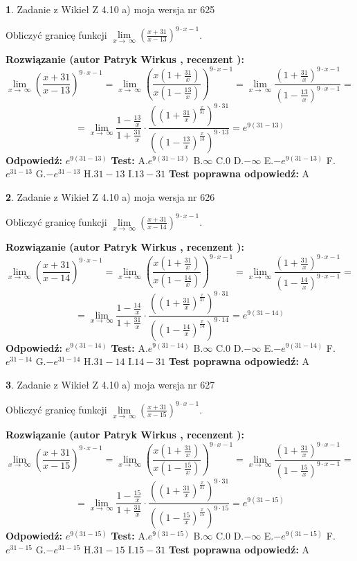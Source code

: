 \documentclass[12pt, a4paper]{article}
\theoremstyle{definition} %
\newtheorem{zad}{}
\newcommand{\zadStart}[1]{\begin{zad}#1\newline}
\newcommand{\zadStop}{\end{zad}}
\newcommand{\rozwStart}[2]{\noindent \textbf{Rozwiązanie (autor #1 , recenzent #2): }\newline}
\newcommand{\rozwStop}{\newline}
\newcommand{\odpStart}{\noindent \textbf{Odpowiedź:}\newline}
\newcommand{\odpStop}{\newline}
\newcommand{\testStart}{\noindent \textbf{Test:}\newline}
\newcommand{\testStop}{\newline}
\newcommand{\kluczStart}{\noindent \textbf{Test poprawna odpowiedź:}\newline}
\newcommand{\kluczStop}{\newline}
\begin{document}
\zadStart{Zadanie z Wikieł Z 4.10 a) moja wersja nr 625}


Obliczyć granicę funkcji  $\lim\limits_{x\to\ \infty}(\frac{x+31}{x-13})^{9\cdot x-1}$.
\zadStop
\rozwStart{Patryk Wirkus}{}
$$\lim\limits_{x\to\ \infty}(\frac{x+31}{x-13})^{9\cdot x-1} = \lim\limits_{x\to\ \infty}(\frac{x(1+\frac{31}{x})}{x(1-\frac{13}{x})})^{9\cdot x-1}=\lim\limits_{x\to\ \infty}\frac{(1+\frac{31}{x})^{9\cdot x-1}}{(1-\frac{13}{x})^{9\cdot x-1}}=$$
$$=\lim\limits_{x\to\ \infty}\frac{1-\frac{13}{x}}{1+\frac{31}{x}}\cdot\frac{((1+\frac{31}{x})^{\frac{x}{31}})^{9\cdot31}}{((1-\frac{13}{x})^{\frac{x}{13}})^{9\cdot13}}=e^{9(31-13)}$$
\rozwStop
\odpStart
$e^{9(31-13)}$
\odpStop
\testStart
A.$e^{9(31-13)}$ B.$\infty$ C.$0$ D.$-\infty$ E.$-e^{9(31-13)}$
F.$e^{31-13}$ G.$-e^{31-13}$
H.$31-13$
I.$13-31$
\testStop
\kluczStart
A
\kluczStop



\zadStart{Zadanie z Wikieł Z 4.10 a) moja wersja nr 626}


Obliczyć granicę funkcji  $\lim\limits_{x\to\ \infty}(\frac{x+31}{x-14})^{9\cdot x-1}$.
\zadStop
\rozwStart{Patryk Wirkus}{}
$$\lim\limits_{x\to\ \infty}(\frac{x+31}{x-14})^{9\cdot x-1} = \lim\limits_{x\to\ \infty}(\frac{x(1+\frac{31}{x})}{x(1-\frac{14}{x})})^{9\cdot x-1}=\lim\limits_{x\to\ \infty}\frac{(1+\frac{31}{x})^{9\cdot x-1}}{(1-\frac{14}{x})^{9\cdot x-1}}=$$
$$=\lim\limits_{x\to\ \infty}\frac{1-\frac{14}{x}}{1+\frac{31}{x}}\cdot\frac{((1+\frac{31}{x})^{\frac{x}{31}})^{9\cdot31}}{((1-\frac{14}{x})^{\frac{x}{14}})^{9\cdot14}}=e^{9(31-14)}$$
\rozwStop
\odpStart
$e^{9(31-14)}$
\odpStop
\testStart
A.$e^{9(31-14)}$ B.$\infty$ C.$0$ D.$-\infty$ E.$-e^{9(31-14)}$
F.$e^{31-14}$ G.$-e^{31-14}$
H.$31-14$
I.$14-31$
\testStop
\kluczStart
A
\kluczStop



\zadStart{Zadanie z Wikieł Z 4.10 a) moja wersja nr 627}


Obliczyć granicę funkcji  $\lim\limits_{x\to\ \infty}(\frac{x+31}{x-15})^{9\cdot x-1}$.
\zadStop
\rozwStart{Patryk Wirkus}{}
$$\lim\limits_{x\to\ \infty}(\frac{x+31}{x-15})^{9\cdot x-1} = \lim\limits_{x\to\ \infty}(\frac{x(1+\frac{31}{x})}{x(1-\frac{15}{x})})^{9\cdot x-1}=\lim\limits_{x\to\ \infty}\frac{(1+\frac{31}{x})^{9\cdot x-1}}{(1-\frac{15}{x})^{9\cdot x-1}}=$$
$$=\lim\limits_{x\to\ \infty}\frac{1-\frac{15}{x}}{1+\frac{31}{x}}\cdot\frac{((1+\frac{31}{x})^{\frac{x}{31}})^{9\cdot31}}{((1-\frac{15}{x})^{\frac{x}{15}})^{9\cdot15}}=e^{9(31-15)}$$
\rozwStop
\odpStart
$e^{9(31-15)}$
\odpStop
\testStart
A.$e^{9(31-15)}$ B.$\infty$ C.$0$ D.$-\infty$ E.$-e^{9(31-15)}$
F.$e^{31-15}$ G.$-e^{31-15}$
H.$31-15$
I.$15-31$
\testStop
\kluczStart
A
\kluczStop
\end{document}

